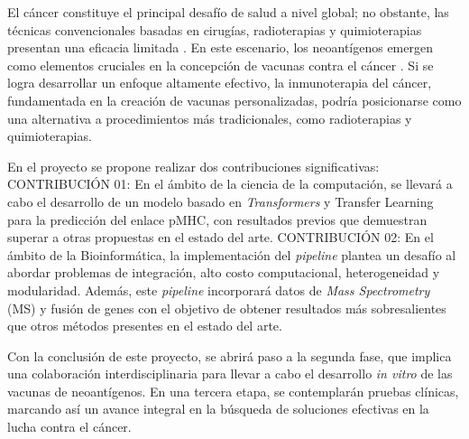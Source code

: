 \documentclass[a4paper,11pt]{article}
\begin{document}

El cáncer constituye el principal desafío de salud a nivel global; no obstante, las técnicas convencionales basadas en cirugías, radioterapias y quimioterapias presentan una eficacia limitada \cite{peng2019neoantigen}. En este escenario, los neoantígenos emergen como elementos cruciales en la concepción de vacunas contra el cáncer \cite{borden2022cancer,chen2021challenges,gopanenko2020main}. Si se logra desarrollar un enfoque altamente efectivo, la inmunoterapia del cáncer, fundamentada en la creación de vacunas personalizadas, podría posicionarse como una alternativa a procedimientos más tradicionales, como radioterapias y quimioterapias.

En el proyecto se propone realizar dos contribuciones significativas: CONTRIBUCIÓN 01: En el ámbito de la ciencia de la computación, se llevará a cabo el desarrollo de un modelo basado en \textit{Transformers} y Transfer Learning para la predicción del enlace pMHC, con resultados previos que demuestran superar a otras propuestas en el estado del arte. CONTRIBUCIÓN 02: En el ámbito de la Bioinformática, la implementación del \textit{pipeline} plantea un desafío al abordar problemas de integración, alto costo computacional, heterogeneidad y modularidad. Además, este \textit{pipeline} incorporará datos de \textit{Mass Spectrometry} (MS) y fusión de genes con el objetivo de obtener resultados más sobresalientes que otros métodos presentes en el estado del arte.

Con la conclusión de este proyecto, se abrirá paso a la segunda fase, que implica una colaboración interdisciplinaria para llevar a cabo el desarrollo \textit{in vitro} de las vacunas de neoantígenos. En una tercera etapa, se contemplarán pruebas clínicas, marcando así un avance integral en la búsqueda de soluciones efectivas en la lucha contra el cáncer.
\end{document}
